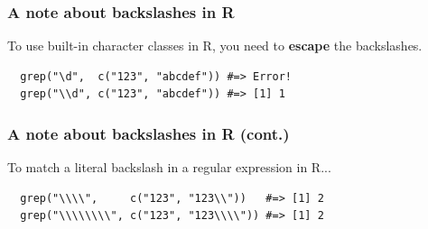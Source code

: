 \documentclass{beamer}
\begin{document}
\begin{frame}[fragile]
  \frametitle{A note about backslashes in R}
  To use built-in character classes in R, you need to \textbf{escape} the
  backslashes.
  \vspace{3mm}

\begin{verbatim}
  grep("\d",  c("123", "abcdef")) #=> Error!
  grep("\\d", c("123", "abcdef")) #=> [1] 1
\end{verbatim}
\end{frame}
\begin{frame}[fragile]
  \frametitle{A note about backslashes in R (cont.)}
  To match a literal backslash in a regular expression in R...
  \vspace{3mm}

\begin{verbatim}
  grep("\\\\",     c("123", "123\\"))   #=> [1] 2
  grep("\\\\\\\\", c("123", "123\\\\")) #=> [1] 2
\end{verbatim}
\end{frame}
\end{document}

